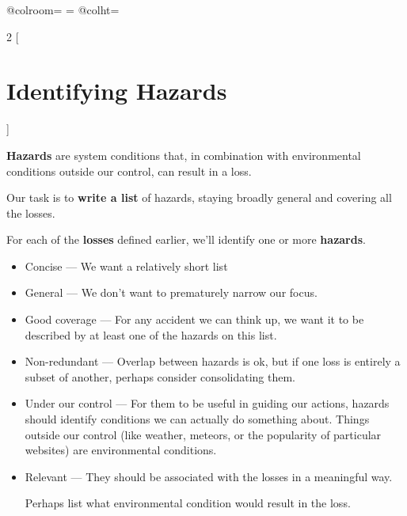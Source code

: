 \documentclass[a4paper]{tufte-book}
\begin{document}
\newtheorem{example}{Ex}

\begin{landscape}
\advance{}
\csname @colroom\endcsname=\vsize
\textheight=\vsize
\csname @colht\endcsname=\vsize

\setlength{\parindent}{0em}
\setlength{\parskip}{.75em}

\begin{multicols}{2}
[ \section{Identifying Hazards}]


\textbf{Hazards} are system conditions that, in combination with environmental conditions outside our control, can result in a loss.

Our task is to \textbf{write a list} of hazards, staying broadly general and covering all the losses.

For each of the \textbf{losses} defined earlier, we'll identify one or more \textbf{hazards}. 






\columnbreak

\begin{itemize}
\setlength{\itemsep}{0pt}
\setlength{\parskip}{.25em}
\item Concise --- We want a relatively short list
\item General --- We don't want to prematurely narrow our focus. 
\item Good coverage --- For any accident we can think up, we want it to be described by at least one of the hazards on this list.
\item Non-redundant --- Overlap between hazards is ok, but if one loss is entirely a subset of another, perhaps consider consolidating them.
\item Under our control --- For them to be useful in guiding our actions, hazards should identify conditions we can actually do something about. Things outside our control (like weather, meteors, or the popularity of particular websites) are environmental conditions.
\item Relevant --- They should be associated with the losses in a meaningful way. 

Perhaps list what environmental condition would result in the loss.
\end{itemize}  
 

\end{multicols}
\end{landscape}
\end{document}
